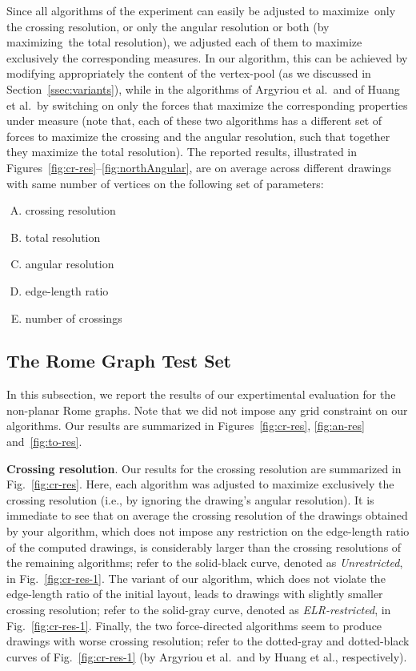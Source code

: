 \documentclass{comjnl}
\newcommand{\myparagraph}[1]{\medskip\noindent\textbf{#1}.}
\begin{document}
Since all algorithms of the experiment can easily be adjusted to maximize~only the crossing resolution, or only the angular resolution or both (by maximizing~the total resolution), we adjusted each of them to maximize exclusively the corresponding measures. In our algorithm, this can be achieved by modifying appropriately the content of the vertex-pool (as we discussed in Section~\ref{ssec:variants}), while in the algorithms of Argyriou et al.\ and of Huang et al.\ by switching on only the forces that maximize the corresponding properties under measure (note that, each of these two algorithms has a different set of forces to maximize the crossing and the angular resolution, such that together they maximize the total resolution). The reported results, illustrated in Figures~\ref{fig:cr-res}--\ref{fig:northAngular}, are on average across different drawings with same number of vertices on the following set of parameters:
%
\begin{enumerate}[P.1.]
\item \label{p:cr-res} crossing resolution
\item \label{p:to-res} total resolution
\item \label{p:an-res} angular resolution
\item \label{p:as-rat} edge-length ratio
\item \label{p:no-xing} number of crossings
\end{enumerate}


\subsection{The Rome Graph Test Set}
\label{ssec:rome}

In this subsection, we report the results of our expertimental evaluation for the non-planar Rome graphs. Note that we did not impose any grid constraint on our algorithms. Our results are summarized in Figures~\ref{fig:cr-res}, \ref{fig:an-res} and~\ref{fig:to-res}.

\myparagraph{Crossing resolution} Our results for the crossing resolution are summarized in Fig.~\ref{fig:cr-res}. Here, each algorithm was adjusted to maximize exclusively the crossing resolution (i.e., by ignoring the drawing's angular resolution). It is immediate to see that on average the crossing resolution of the drawings obtained by your algorithm, which does not impose any restriction on the edge-length ratio of the computed drawings, is considerably larger than the crossing resolutions of the remaining algorithms; refer to the solid-black curve, denoted as \emph{Unrestricted}, in Fig.~\ref{fig:cr-res-1}. The variant of our algorithm, which does not violate the edge-length ratio of the initial layout, leads to drawings with slightly smaller crossing resolution; refer to the solid-gray curve, denoted as \emph{ELR-restricted}, in Fig.~\ref{fig:cr-res-1}. Finally, the two force-directed algorithms seem to produce drawings with worse crossing resolution; refer to the dotted-gray and dotted-black curves of Fig.~\ref{fig:cr-res-1} (by Argyriou et al.\ and by Huang et al., respectively).
\end{document}
